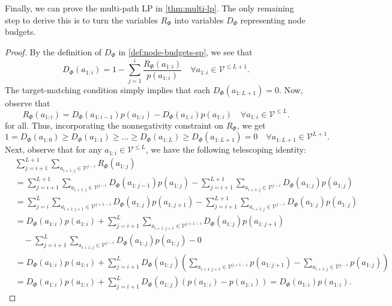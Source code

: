 \documentclass{article}
\theoremstyle{plain}
\theoremstyle{definition}
\theoremstyle{remark}
\newcommand{\V}{\mathcal{V}}
\begin{document}
Finally, we can prove the multi-path LP in \cref{thm:multi-lp}. The only remaining step to derive this is to turn the variables $R_\Phi$ into variables $D_\Phi$ representing node budgets.

\begin{proof}
    By the definition of $D_\Phi$ in \cref{def:node-budgets-sp}, we see that
    \begin{equation}
        D_\Phi(a_{1:i}) = 1-\sum_{j=1}^{i} \frac{R_\Phi(a_{1:i})}{p(a_{1:i})} \quad \forall a_{1:i} \in \V^{\leq L+1}.
    \end{equation}
    The target-matching condition simply implies that each $D_{\Phi}(a_{1:L+1})=0$. Now, observe that
    \begin{equation}
    R_\Phi(a_{1:i}) = D_\Phi(a_{1:i-1})p(a_{1:i}) - D_\Phi(a_{1:i})p(a_{1:i}) \quad \forall a_{1:i} \in \V^{\leq L}.
    \end{equation} for all. Thus, incorporating the nonnegativity constraint on $R_\Phi$, we get
    \begin{equation}
        1 = D_\Phi(a_{1:0}) \geq D_\Phi(a_{1:1}) \geq \ldots \geq D_\Phi(a_{1:L}) \geq D_\Phi(a_{1:L+1})=0\quad \forall a_{1:L+1} \in \V^{L+1}.
    \end{equation}
    Next, observe that for any $a_{1:i} \in \V^{\leq L}$, we have the following telescoping identity:
    \begin{align}
        &\sum_{j=i+1}^{L+1} \sum_{a_{i+1:j} \in \V^{j-i}} R_\Phi(a_{1:j})
        \\ &= \sum_{j=i+1}^{L+1} \sum_{a_{i+1:j} \in \V^{j-i}}  D_\Phi(a_{1:j-1})p(a_{1:j}) - \sum_{j=i+1}^{L+1} \sum_{a_{i+1:j} \in \V^{j-i}}  D_\Phi(a_{1:j})p(a_{1:j}) \\ 
        &= \sum_{j=i}^{L} \sum_{a_{i+1:j+1} \in \V^{j+1-i}}  D_\Phi(a_{1:j})p(a_{1:j+1}) - \sum_{j=i+1}^{L+1} \sum_{a_{i+1:j} \in \V^{j-i}}  D_\Phi(a_{1:j})p(a_{1:j}) \\
        &= D_\Phi(a_{1:i})p(a_{1:i})+\sum_{j=i+1}^{L} \sum_{a_{i+1:j+1} \in \V^{j+1-i}}  D_\Phi(a_{1:j})p(a_{1:j+1}) \\ &\quad - \sum_{j=i+1}^{L} \sum_{a_{i+1:j} \in \V^{j-i}}  D_\Phi(a_{1:j})p(a_{1:j}) - 0\\
        &= D_\Phi(a_{1:i})p(a_{1:i})+\sum_{j=i+1}^{L} D_\Phi(a_{1:j})\left(\sum_{a_{i+1:j+1} \in \V^{j+1-i}} p(a_{1:j+1}) - \sum_{a_{i+1:j} \in \V^{j-i}}  p(a_{1:j})\right) \\
        &= D_\Phi(a_{1:i})p(a_{1:i})+\sum_{j=i+1}^{L} D_\Phi(a_{1:j})\left(p(a_{1:i})-p(a_{1:i})\right)  = D_\Phi(a_{1:i})p(a_{1:i}).

\end{align}
\end{proof}
\end{document}
